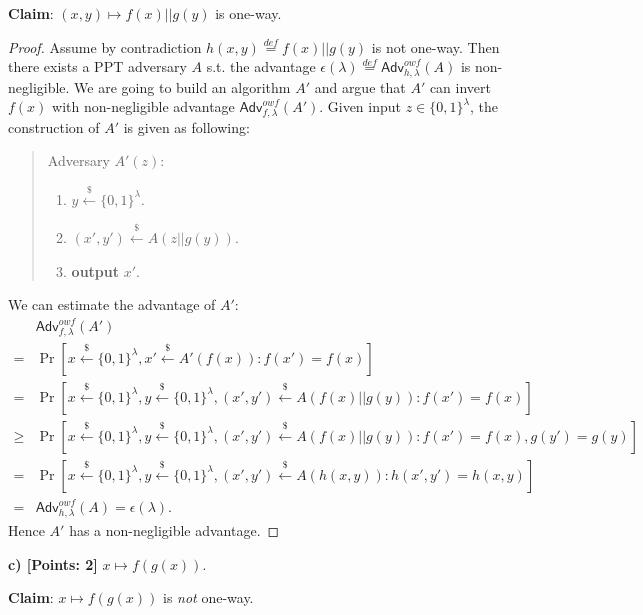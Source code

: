 \documentclass[12pt]{article}
\newcommand{\eqdef}{\stackrel{def}{=}}
\newcommand{\bits}{\{0,1\}}
\newcommand{\getsr}{\stackrel{\$}{\gets}}
\newcommand{\Adv}{\textsf{Adv}}
\theoremstyle{definition}
\begin{document}
{\bf Claim}: $(x, y) \mapsto f(x) || g(y)$ is one-way.
\begin{proof}
Assume by contradiction $h(x, y) \eqdef f(x) || g(y)$ is not one-way. Then there exists a PPT adversary $A$ s.t. the advantage $\epsilon(\lambda) \eqdef \Adv_{h,\lambda}^{owf}(A)$ is non-negligible. We are going to build an algorithm $A'$ and argue that $A'$ can invert $f(x)$ with non-negligible advantage $\Adv_{f,\lambda}^{owf}(A')$. Given input $z \in\bits^{\lambda}$, the construction of $A'$ is given as following:
\begin{quote}
Adversary $A' (z)$:
\begin{enumerate}
\item $y \getsr \bits^\lambda$.
\item $(x', y') \getsr A(z || g(y))$.
\item {\bf output} $x'$.
\end{enumerate}
\end{quote}
We can estimate the advantage of $A'$:
$$
\begin{aligned}
& \Adv_{f,\lambda}^{owf}(A') \\
=& \Pr[x\getsr \bits^\lambda, x' \getsr A'(f(x)) : f(x')=f(x)] \\
=& \Pr[x\getsr \bits^\lambda, y\getsr \bits^\lambda, (x', y') \getsr A(f(x) || g(y)) : f(x')=f(x)] \\
\geq & \Pr[x\getsr \bits^\lambda, y\getsr \bits^\lambda, (x', y') \getsr A(f(x) || g(y)) : f(x')=f(x), g(y')=g(y)] \\
=& \Pr[x\getsr \bits^\lambda, y\getsr \bits^\lambda, (x', y') \getsr A(h(x, y)) : h(x', y')=h(x, y)] \\
=& \Adv_{h,\lambda}^{owf}(A) = \epsilon(\lambda).
\end{aligned}
$$
Hence $A'$ has a non-negligible advantage.
\end{proof}

{\bf c) [Points: 2]} $x \mapsto f(g(x))$.

{\bf Claim}: $x \mapsto f(g(x))$ is \emph{not} one-way.
\end{document}
